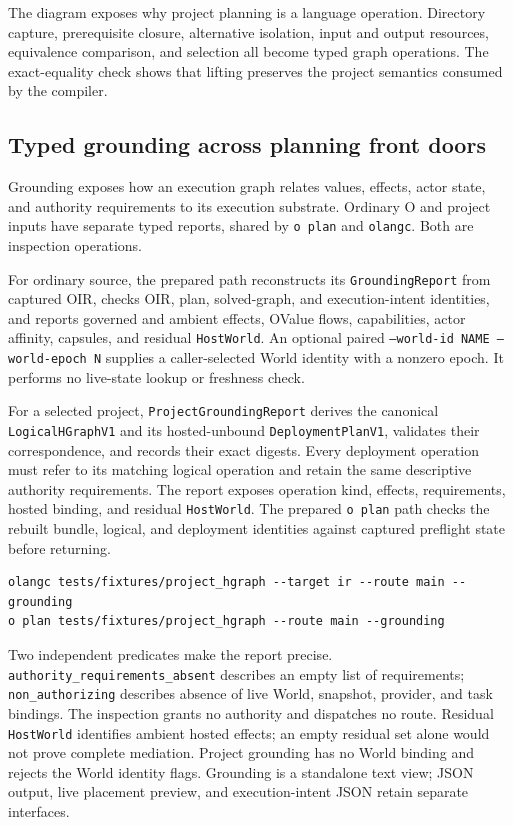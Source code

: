 \documentclass[11pt,oneside]{article}
\begin{document}
The diagram exposes why project planning is a language operation. Directory
capture, prerequisite closure, alternative isolation, input and output
resources, equivalence comparison, and selection all become typed graph
operations. The exact-equality check shows that lifting preserves the project
semantics consumed by the compiler.

\subsection{Typed grounding across planning front doors}
\label{sec:grounding}

Grounding exposes how an execution graph relates values, effects, actor state,
and authority requirements to its execution substrate. Ordinary O and project
inputs have separate typed reports, shared by \texttt{o plan} and
\texttt{olangc}. Both are inspection operations.

For ordinary source, the prepared path reconstructs its \texttt{GroundingReport}
from captured OIR, checks OIR, plan, solved-graph, and execution-intent
identities, and reports governed and ambient effects, OValue flows,
capabilities, actor affinity, capsules, and residual \texttt{HostWorld}.
An optional paired \texttt{--world-id NAME --world-epoch N} supplies a
caller-selected World identity with a nonzero epoch. It performs no live-state
lookup or freshness check.

For a selected project, \texttt{ProjectGroundingReport} derives the canonical
\texttt{LogicalHGraphV1} and its hosted-unbound \texttt{DeploymentPlanV1},
validates their correspondence, and records their exact digests. Every
deployment operation must refer to its matching logical operation and retain
the same descriptive authority requirements. The report exposes operation
kind, effects, requirements, hosted binding, and residual \texttt{HostWorld}.
The prepared \texttt{o plan} path checks the rebuilt bundle, logical, and
deployment identities against captured preflight state before returning.

\begin{lstlisting}[style=plaincode]
olangc tests/fixtures/project_hgraph --target ir --route main --grounding
o plan tests/fixtures/project_hgraph --route main --grounding
\end{lstlisting}

Two independent predicates make the report precise.
\texttt{authority\_requirements\_absent} describes an empty list of
requirements; \texttt{non\_authorizing} describes absence of live World,
snapshot, provider, and task bindings. The inspection grants no authority and
dispatches no route. Residual \texttt{HostWorld} identifies ambient hosted
effects; an empty residual set alone would not prove complete mediation.
Project grounding has no World binding and rejects the World identity flags.
Grounding is a standalone text view; JSON output, live placement preview, and
execution-intent JSON retain separate interfaces.
\end{document}
